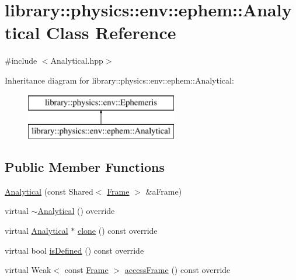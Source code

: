\hypertarget{classlibrary_1_1physics_1_1env_1_1ephem_1_1_analytical}{}\section{library\+:\+:physics\+:\+:env\+:\+:ephem\+:\+:Analytical Class Reference}
\label{classlibrary_1_1physics_1_1env_1_1ephem_1_1_analytical}


{\ttfamily \#include $<$Analytical.\+hpp$>$}

Inheritance diagram for library\+:\+:physics\+:\+:env\+:\+:ephem\+:\+:Analytical\+:\begin{figure}[H]
\begin{center}
\leavevmode
\includegraphics[height=2.000000cm]{classlibrary_1_1physics_1_1env_1_1ephem_1_1_analytical}
\end{center}
\end{figure}
\subsection*{Public Member Functions}
\begin{DoxyCompactItemize}
\item 
\hyperlink{classlibrary_1_1physics_1_1env_1_1ephem_1_1_analytical_af74e01bea441355b0ad445f94c10eb3a}{Analytical} (const Shared$<$ \hyperlink{classlibrary_1_1physics_1_1coord_1_1_frame}{Frame} $>$ \&a\+Frame)
\item 
virtual \hyperlink{classlibrary_1_1physics_1_1env_1_1ephem_1_1_analytical_a0219af2c16308c2e7d39e40ba57fa11e}{$\sim$\+Analytical} () override
\item 
virtual \hyperlink{classlibrary_1_1physics_1_1env_1_1ephem_1_1_analytical}{Analytical} $\ast$ \hyperlink{classlibrary_1_1physics_1_1env_1_1ephem_1_1_analytical_acd51ca99177b1433b6623829ae003bec}{clone} () const override
\item 
virtual bool \hyperlink{classlibrary_1_1physics_1_1env_1_1ephem_1_1_analytical_a0c0fe5d8326ba439bb0b51e7536ab0fd}{is\+Defined} () const override
\item 
virtual Weak$<$ const \hyperlink{classlibrary_1_1physics_1_1coord_1_1_frame}{Frame} $>$ \hyperlink{classlibrary_1_1physics_1_1env_1_1ephem_1_1_analytical_a5de6a5ae0fe86c7e2ad76a3848820899}{access\+Frame} () const override
\end{DoxyCompactItemize}


